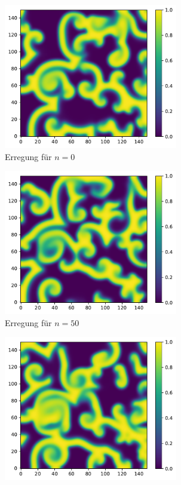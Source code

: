 \begin{appendices}
\begin{figure}[h]
	\centering
	\begin{subfigure}{.5\textwidth}
		\centering
		\includegraphics[height=2.5in]{figures/results/dynamics/barkley_0.pdf}
		\setcapmargin[1cm]{0.5cm}
		\caption{Erregung für $n=0$}
	\end{subfigure}%
	\begin{subfigure}{.5\textwidth}
		\centering
		\includegraphics[height=2.5in]{figures/results/dynamics/barkley_50.pdf}
		\setcapmargin[1cm]{0.5cm}
		\caption{Erregung für $n=50$}
	\end{subfigure}
	\begin{subfigure}{.5\textwidth}
		\centering
		\includegraphics[height=2.5in]{figures/results/dynamics/barkley_100.pdf}

\end{subfigure}
\end{figure}
\end{appendices}
